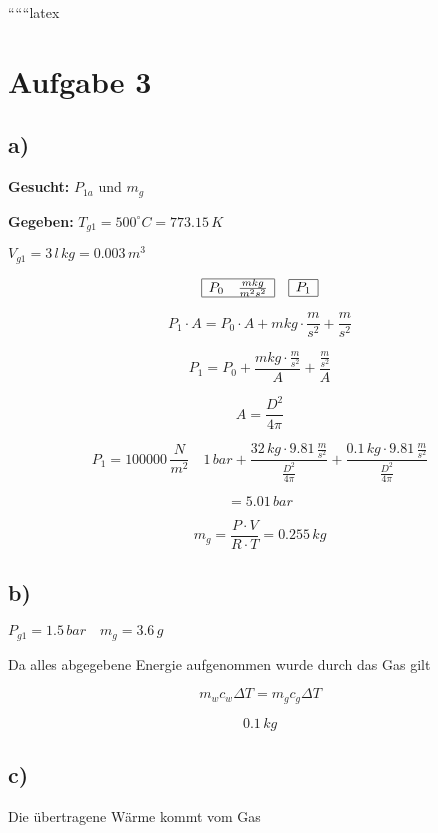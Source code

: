 
``````latex


\section*{Aufgabe 3}

\subsection*{a)}
\textbf{Gesucht:} $P_{1a}$ und $m_g$

\textbf{Gegeben:} $T_{g1} = 500^\circ C = 773.15\,K$

$V_{g1} = 3\,l\,kg = 0.003\,m^3$

\[
\begin{array}{c}
\begin{array}{|c|}
\hline
P_0 \quad \frac{mkg}{m^2s^2} \\
\hline
\end{array}
\quad
\begin{array}{|c|}
\hline
P_1 \\
\hline
\end{array}
\end{array}
\]

\[
P_1 \cdot A = P_0 \cdot A + mkg \cdot \frac{m}{s^2} + \frac{m}{s^2}
\]

\[
P_1 = P_0 + \frac{mkg \cdot \frac{m}{s^2}}{A} + \frac{\frac{m}{s^2}}{A}
\]

\[
A = \frac{D^2}{4\pi}
\]

\[
P_1 = 100000\,\frac{N}{m^2} \quad 1\,bar + \frac{32\,kg \cdot 9.81\,\frac{m}{s^2}}{\frac{D^2}{4\pi}} + \frac{0.1\,kg \cdot 9.81\,\frac{m}{s^2}}{\frac{D^2}{4\pi}}
\]

\[
= 5.01\,bar
\]

\[
m_g = \frac{P \cdot V}{R \cdot T} = 0.255\,kg
\]

\subsection*{b)}
$P_{g1} = 1.5\,bar \quad m_g = 3.6\,g$

Da alles abgegebene Energie aufgenommen wurde durch das Gas gilt

\[
m_w c_w \Delta T = m_g c_g \Delta T
\]

\[
0.1\,kg
\]

\subsection*{c)}
Die übertragene Wärme kommt vom Gas


